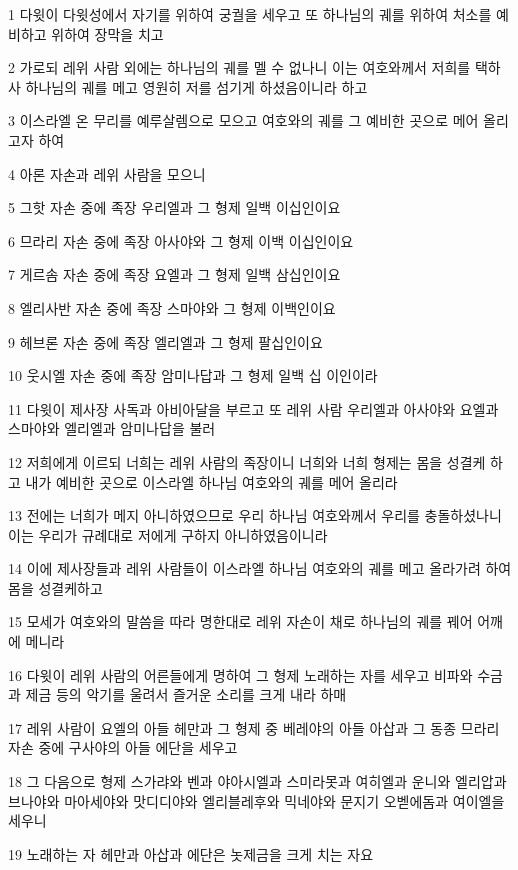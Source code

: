 \par 1 다윗이 다윗성에서 자기를 위하여 궁궐을 세우고 또 하나님의 궤를 위하여 처소를 예비하고 위하여 장막을 치고
\par 2 가로되 레위 사람 외에는 하나님의 궤를 멜 수 없나니 이는 여호와께서 저희를 택하사 하나님의 궤를 메고 영원히 저를 섬기게 하셨음이니라 하고
\par 3 이스라엘 온 무리를 예루살렘으로 모으고 여호와의 궤를 그 예비한 곳으로 메어 올리고자 하여
\par 4 아론 자손과 레위 사람을 모으니
\par 5 그핫 자손 중에 족장 우리엘과 그 형제 일백 이십인이요
\par 6 므라리 자손 중에 족장 아사야와 그 형제 이백 이십인이요
\par 7 게르솜 자손 중에 족장 요엘과 그 형제 일백 삼십인이요
\par 8 엘리사반 자손 중에 족장 스마야와 그 형제 이백인이요
\par 9 헤브론 자손 중에 족장 엘리엘과 그 형제 팔십인이요
\par 10 웃시엘 자손 중에 족장 암미나답과 그 형제 일백 십 이인이라
\par 11 다윗이 제사장 사독과 아비아달을 부르고 또 레위 사람 우리엘과 아사야와 요엘과 스마야와 엘리엘과 암미나답을 불러
\par 12 저희에게 이르되 너희는 레위 사람의 족장이니 너희와 너희 형제는 몸을 성결케 하고 내가 예비한 곳으로 이스라엘 하나님 여호와의 궤를 메어 올리라
\par 13 전에는 너희가 메지 아니하였으므로 우리 하나님 여호와께서 우리를 충돌하셨나니 이는 우리가 규례대로 저에게 구하지 아니하였음이니라
\par 14 이에 제사장들과 레위 사람들이 이스라엘 하나님 여호와의 궤를 메고 올라가려 하여 몸을 성결케하고
\par 15 모세가 여호와의 말씀을 따라 명한대로 레위 자손이 채로 하나님의 궤를 꿰어 어깨에 메니라
\par 16 다윗이 레위 사람의 어른들에게 명하여 그 형제 노래하는 자를 세우고 비파와 수금과 제금 등의 악기를 울려서 즐거운 소리를 크게 내라 하매
\par 17 레위 사람이 요엘의 아들 헤만과 그 형제 중 베레야의 아들 아삽과 그 동종 므라리 자손 중에 구사야의 아들 에단을 세우고
\par 18 그 다음으로 형제 스가랴와 벤과 야아시엘과 스미라못과 여히엘과 운니와 엘리압과 브나야와 마아세야와 맛디디야와 엘리블레후와 믹네야와 문지기 오벧에돔과 여이엘을 세우니
\par 19 노래하는 자 헤만과 아삽과 에단은 놋제금을 크게 치는 자요
